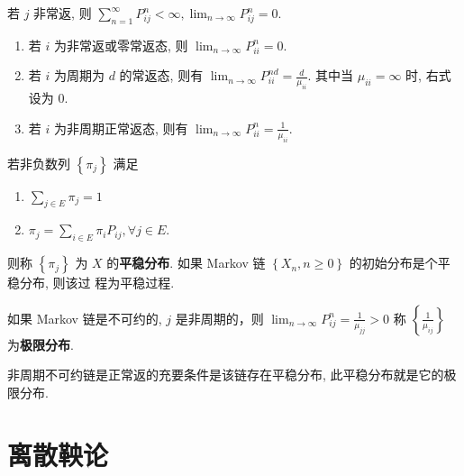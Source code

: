 \documentclass[10pt]{yerbaformat}
\begin{document}
\begin{corollary}
    若 $j$ 非常返, 则 $\sum_{n=1}^{\infty} P_{i j}^{n}<\infty, \lim _{n \rightarrow \infty} P_{i j}^{n}=0 .$
\end{corollary}

\begin{theorem}[基本极限定理]
    \begin{enumerate}
        \item 若 $i$ 为非常返或零常返态, 则 $\lim _{n \rightarrow \infty} P_{i i}^{n}=0 .$
        \item 若 $i$ 为周期为 $d$ 的常返态, 则有 $\lim _{n \rightarrow \infty} P_{i i}^{n d}=\frac{d}{\mu_{i i}}$.
              其中当 $\mu_{i i}=\infty$ 时, 右式设为 $0 .$
        \item 若 $i$ 为非周期正常返态, 则有 $\lim _{n \rightarrow \infty} P_{i i}^{n}=\frac{1}{\mu_{i i}}$.
    \end{enumerate}
\end{theorem}

\begin{definition}[平稳分布]
    若非负数列 $\left\{\pi_{j}\right\}$ 满足
    \begin{enumerate}
        \item $\sum_{j \in E} \pi_{j}=1$
        \item $\pi_{j}=\sum_{i \in E} \pi_{i} P_{i j}, \forall j \in E$.
    \end{enumerate}
    则称 $\left\{\pi_{j}\right\}$ 为 $X$ 的\textbf{平稳分布}. 如果 Markov 链 $\left\{X_{n}, n \geq 0\right\}$ 的初始分布是个平稳分布, 则该过
    程为平稳过程.
\end{definition}

\begin{lemma}
    如果 Markov 链是不可约的, $j$ 是非周期的，则 $\lim _{n \rightarrow \infty} P_{i j}^{n}=\frac{1}{\mu_{j j}}>0$ 称 $\left\{\frac{1}{\mu_{i j}}\right\}$ 为\textbf{极限分布}.
\end{lemma}

\begin{theorem}
    非周期不可约链是正常返的充要条件是该链存在平稳分布, 此平稳分布就是它的极限分布.
\end{theorem}

\section{离散鞅论}
\end{document}
